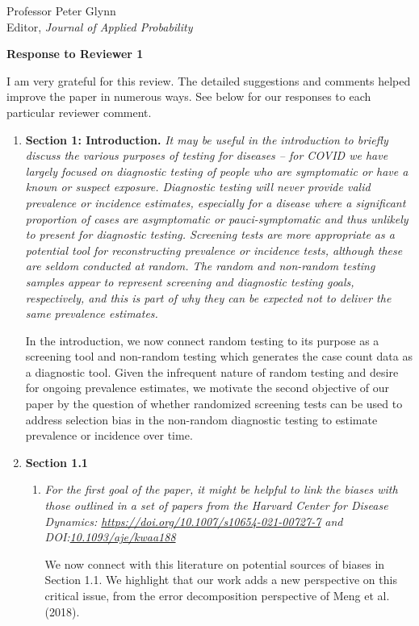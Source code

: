 \documentclass[11pt]{letter} %
\begin{document}
\begin{letter}{Professor
	Peter Glynn\\
	Editor, {\em Journal of Applied Probability}}
\begin{enumerate}
\end{enumerate}
\newpage
{\bf Response to Reviewer 1}
\vspace{5mm}

I am very grateful for this review.  The detailed suggestions and comments helped improve the paper in numerous ways.  See below for our responses to each particular reviewer comment.

\begin{enumerate}
\item {\bf Section 1: Introduction.} {\it It may be useful in the introduction to briefly discuss the various purposes of testing for diseases – for COVID we have largely focused on diagnostic testing of people who are symptomatic or have a known or suspect exposure. Diagnostic testing will never provide valid prevalence or incidence estimates, especially for a disease where a significant proportion of cases are asymptomatic or pauci-symptomatic and thus unlikely to present for diagnostic testing. Screening tests are more appropriate as a potential tool for reconstructing prevalence or incidence tests, although these are seldom conducted at random. The random and non-random testing samples appear to represent screening and diagnostic testing goals, respectively, and this is part of why they can be expected not to deliver the same prevalence estimates.}

\vspace{5mm}
In the introduction, we now connect random testing to its purpose as a screening tool and non-random testing which generates the case count data as a diagnostic tool.  Given the infrequent nature of random testing and desire for ongoing prevalence estimates, we motivate the second objective of our paper by the question of whether randomized screening tests can be used to address selection bias in the non-random diagnostic testing to estimate prevalence or incidence over time.
\vspace{5mm}

\item {\bf Section 1.1}
\begin{enumerate}
	\item {\it For the first goal of the paper, it might be helpful to link the biases with those outlined in a set of papers from the Harvard Center for Disease Dynamics: \url{https://doi.org/10.1007/s10654-021-00727-7} and DOI:\url{10.1093/aje/kwaa188}}
	\vspace{5mm}

	We now connect with this literature on potential sources of biases in Section 1.1.  We highlight that our work adds a new perspective on this critical issue, from the error decomposition perspective of Meng et al. (2018).
	\vspace{5mm}


\end{enumerate}
\end{enumerate}
\end{letter}
\end{document}
